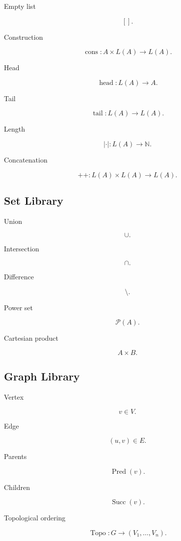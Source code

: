 \documentclass[12pt,oneside]{article}
\theoremstyle{definition}
\theoremstyle{remark}
\begin{document}
Empty list

\[
[]
.
\]

Construction

\[
\operatorname{cons}
:
A
\times
L(A)
\rightarrow
L(A).
\]

Head

\[
\operatorname{head}
:
L(A)
\rightarrow
A.
\]

Tail

\[
\operatorname{tail}
:
L(A)
\rightarrow
L(A).
\]

Length

\[
|\cdot|
:
L(A)
\rightarrow
\mathbb N.
\]

Concatenation

\[
++
:
L(A)
\times
L(A)
\rightarrow
L(A).
\]

\subsection*{Set Library}

Union

\[
\cup.
\]

Intersection

\[
\cap.
\]

Difference

\[
\setminus.
\]

Power set

\[
\mathcal P(A).
\]

Cartesian product

\[
A\times B.
\]

\subsection*{Graph Library}

Vertex

\[
v
\in
V.
\]

Edge

\[
(u,v)
\in
E.
\]

Parents

\[
\operatorname{Pred}(v).
\]

Children

\[
\operatorname{Succ}(v).
\]

Topological ordering

\[
\operatorname{Topo}
:
G
\rightarrow
(V_1,\ldots,V_n).
\]
\end{document}
